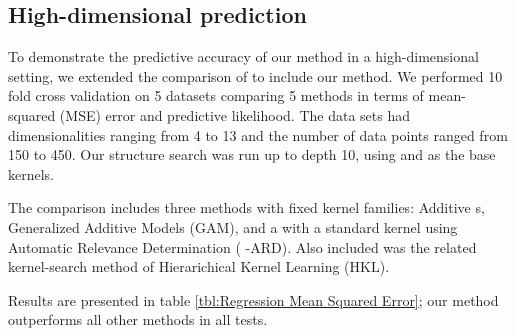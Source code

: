 \documentclass[twoside]{article}
\begin{document}

\subsection{High-dimensional prediction}

To demonstrate the predictive accuracy of our method in a high-dimensional setting, we extended the comparison of \cite{duvenaud2011additive11} to include our method.
We performed 10 fold cross validation on 5 datasets comparing 5 methods in terms of mean-squared (MSE) error and predictive likelihood.   The data sets had dimensionalities ranging from 4 to 13 and the number of data points ranged from 150 to 450.  Our structure search was run up to depth 10, using \kSE{} and \kRQ{} as the base kernels.

The comparison includes three methods with fixed kernel families: Additive \gp{}s, Generalized Additive Models (GAM), and a \gp{} with a standard \kSE{} kernel using Automatic Relevance Determination (\gp{} \kSE{}-ARD).  Also included was the related kernel-search method of Hierarichical Kernel Learning (HKL).


Results are presented in table \ref{tbl:Regression Mean Squared Error}; our method outperforms all other methods in all tests.

%
%
%

%
\end{document}
